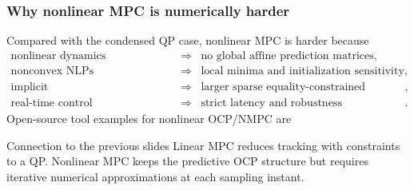 \begin{frame}
	\frametitle{Why nonlinear MPC is numerically harder}
	Compared with the condensed QP case, nonlinear MPC is harder because
	\begin{equation*}
		\begin{array}{rcl}
			\text{nonlinear dynamics}                  & \Rightarrow & \text{no global affine prediction matrices},        \\[1mm]
			\text{nonconvex NLPs}                      & \Rightarrow & \text{local minima and initialization sensitivity}, \\[1mm]
			\text{implicit discretization/collocation} & \Rightarrow & \text{larger sparse equality-constrained problems}, \\[1mm]
			\text{real-time control}                   & \Rightarrow & \text{strict latency and robustness requirements}.
		\end{array}
	\end{equation*}\pause%
	Open-source tool examples for nonlinear OCP/NMPC are
	\begin{center}
	\end{center}\pause%
	\begin{block}{Connection to the previous slides}
		Linear MPC reduces tracking with constraints to a QP. Nonlinear MPC keeps the predictive OCP structure but requires iterative numerical approximations at each sampling instant.
	\end{block}
\end{frame}


